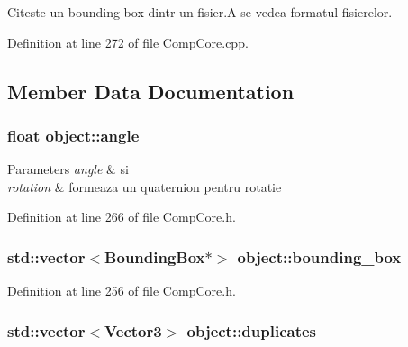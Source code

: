Citeste un bounding box dintr-\/un fisier.\-A se vedea formatul fisierelor. 



Definition at line 272 of file Comp\-Core.\-cpp.



\subsection{Member Data Documentation}
\hypertarget{structobject_ae5a08c19bc968358c53cedad8a1a6ca3}{
\subsubsection[{angle}]{\setlength{\rightskip}{0pt plus 5cm}float object\-::angle}}\label{structobject_ae5a08c19bc968358c53cedad8a1a6ca3}

\begin{DoxyParams}{Parameters}
{\em angle} & si \\
\hline
{\em rotation} & formeaza un quaternion pentru rotatie \\
\hline
\end{DoxyParams}


Definition at line 266 of file Comp\-Core.\-h.

\hypertarget{structobject_acc14551671b33bc6f1204659e581ade8}{
\subsubsection[{bounding\-\_\-box}]{\setlength{\rightskip}{0pt plus 5cm}std\-::vector$<${\bf Bounding\-Box}$\ast$$>$ object\-::bounding\-\_\-box}}\label{structobject_acc14551671b33bc6f1204659e581ade8}


Definition at line 256 of file Comp\-Core.\-h.

\hypertarget{structobject_aba41d6189c68f5b55b17d467258d3365}{
\subsubsection[{duplicates}]{\setlength{\rightskip}{0pt plus 5cm}std\-::vector$<${\bf Vector3}$>$ object\-::duplicates}}\label{structobject_aba41d6189c68f5b55b17d467258d3365}

